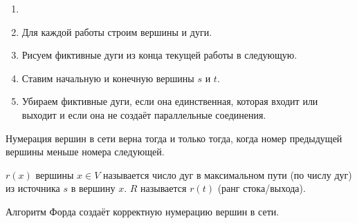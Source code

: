 
\begin{enumerate}[nosep]
	\item[]
	
	\item Для каждой работы строим вершины и дуги.
	
	\item Рисуем фиктивные дуги из конца текущей работы в следующую.
	
	\item Ставим начальную и конечную вершины $s$ и $t$.
	
	\item Убираем фиктивные дуги, если она единственная, которая входит или выходит и если она не создаёт параллельные соединения.
\end{enumerate}

\fact

Нумерация вершин в сети верна тогда и только тогда, когда номер предыдущей вершины меньше номера следующей.


 $r(x)$ вершины $x \in V$ называется число дуг в максимальном пути (по числу дуг) из источника $s$ в вершину $x$.  $R$ называется $r(t)$ (ранг стока/выхода).

\algorithm[Форда]

\fact

Алгоритм Форда создаёт корректную нумерацию вершин в сети.
